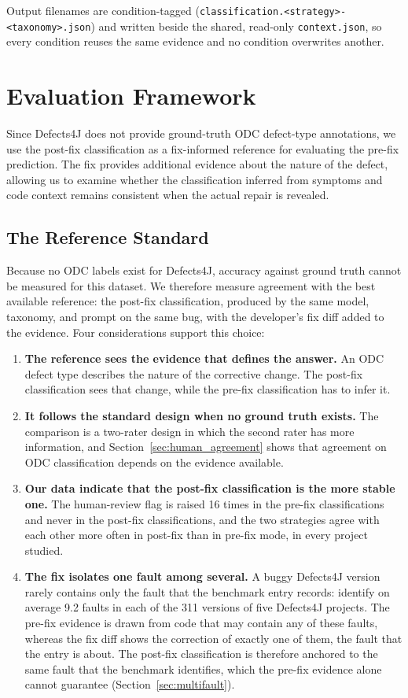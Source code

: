 \documentclass{iutbscthesis}
\begin{document}
Output filenames are condition-tagged (\texttt{classification.<strategy>-<taxonomy>.json}) and written beside the shared, read-only \texttt{context.json}, so every condition reuses the same evidence and no condition overwrites another.

\section{Evaluation Framework}
\label{sec:eval}

Since Defects4J does not provide ground-truth ODC defect-type annotations, we use the post-fix classification as a fix-informed reference for evaluating the pre-fix prediction. The fix provides additional evidence about the nature of the defect, allowing us to examine whether the classification inferred from symptoms and code context remains consistent when the actual repair is revealed.

\subsection{The Reference Standard}

Because no ODC labels exist for Defects4J, accuracy against ground truth cannot be measured for this dataset. We therefore measure agreement with the best available reference: the post-fix classification, produced by the same model, taxonomy, and prompt on the same bug, with the developer's fix diff added to the evidence. Four considerations support this choice:

\begin{enumerate}
    \item \textbf{The reference sees the evidence that defines the answer.} An ODC defect type describes the nature of the corrective change. The post-fix classification sees that change, while the pre-fix classification has to infer it.
    \item \textbf{It follows the standard design when no ground truth exists.} The comparison is a two-rater design in which the second rater has more information, and Section~\ref{sec:human_agreement} shows that agreement on ODC classification depends on the evidence available.
    \item \textbf{Our data indicate that the post-fix classification is the more stable one.} The human-review flag is raised 16 times in the pre-fix classifications and never in the post-fix classifications, and the two strategies agree with each other more often in post-fix than in pre-fix mode, in every project studied.
    \item \textbf{The fix isolates one fault among several.} A buggy Defects4J version rarely contains only the fault that the benchmark entry records: \textcite{callaghan2024mf} identify on average 9.2 faults in each of the 311 versions of five Defects4J projects. The pre-fix evidence is drawn from code that may contain any of these faults, whereas the fix diff shows the correction of exactly one of them, the fault that the entry is about. The post-fix classification is therefore anchored to the same fault that the benchmark identifies, which the pre-fix evidence alone cannot guarantee (Section~\ref{sec:multifault}).
\end{enumerate}
\end{document}
